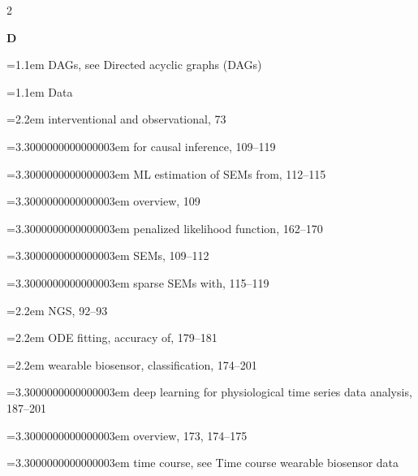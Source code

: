 \begin{multicols}{2}
\par{}\medskip\noindent\textbf{D}\par\nobreak\smallskip\nobreak
\noindent\hangindent=1.1em DAGs, see Directed acyclic graphs (DAGs)\par
\noindent\hangindent=1.1em Data\par
\noindent\hangindent=2.2em \hspace*{1.1em}interventional and observational, 73\par
\noindent\hangindent=3.3000000000000003em \hspace*{2.2em}for causal inference, 109--119\par
\noindent\hangindent=3.3000000000000003em \hspace*{2.2em}ML estimation of SEMs from, 112--115\par
\noindent\hangindent=3.3000000000000003em \hspace*{2.2em}overview, 109\par
\noindent\hangindent=3.3000000000000003em \hspace*{2.2em}penalized likelihood function, 162--170\par
\noindent\hangindent=3.3000000000000003em \hspace*{2.2em}SEMs, 109--112\par
\noindent\hangindent=3.3000000000000003em \hspace*{2.2em}sparse SEMs with, 115--119\par
\noindent\hangindent=2.2em \hspace*{1.1em}NGS, 92--93\par
\noindent\hangindent=2.2em \hspace*{1.1em}ODE fitting, accuracy of, 179--181\par
\noindent\hangindent=2.2em \hspace*{1.1em}wearable biosensor, classification, 174--201\par
\noindent\hangindent=3.3000000000000003em \hspace*{2.2em}deep learning for physiological time series data analysis, 187--201\par
\noindent\hangindent=3.3000000000000003em \hspace*{2.2em}overview, 173, 174--175\par
\noindent\hangindent=3.3000000000000003em \hspace*{2.2em}time course, see Time course wearable biosensor data\par

\end{multicols}
